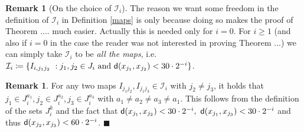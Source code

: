 \documentclass[11pt]{article}
\newcommand{\sfd}{{\sf d}}
\newcommand{\fr}{\penalty-20\null\hfill$\blacksquare$}
\theoremstyle{plain}
\theoremstyle{definition}
\newtheorem{remark}[theorem]{Remark}
\numberwithin{equation}{section}
\begin{document}
\begin{remark}[On the choice of $\mathcal I_i$] 
    The reason we want some freedom in the definition of $\mathcal I_i$  in Definition \ref{maps} is only because doing so  makes the proof of Theorem .... much easier. Actually this is needed only for $i=0.$ For $i\ge 1$ (and also if $i=0$ in the case the reader was not interested in proving Theorem ...) we can  simply take $\mathcal I_i$ to be \textit{all the maps}, i.e.\ $\mathcal I_i\coloneqq \{I_{i,j_1j_2}\ : j_1,j_2 \in J_i \text{ and }\sfd(x_{j_1},x_{j_2})<30\cdot 2^{-i}\}$.
\end{remark}



\begin{remark}\label{QI}
	For any two maps $I_{j_1j_2}, I_{j_1j_3}\in \mathcal I_i$ with $j_2 \neq j_3$, it holds that $j_1 \in J_i^{a_1},j_2 \in J_i^{a_2},j_3\in J_i^{a_3}$ with $a_1\neq a_2 \neq a_3 \neq a_1$. This follows from the definition of the sets $J_{i}^k$ and the fact that $\sfd(x_{j_1},x_{j_2})< 30\cdot  2^{-i},$ $\sfd(x_{j_1},x_{j_3})< 30\cdot  2^{-i}$ and thus $\sfd(x_{j_2},x_{j_3})< 60\cdot  2^{-i}$. \fr
\end{remark}
\end{document}
